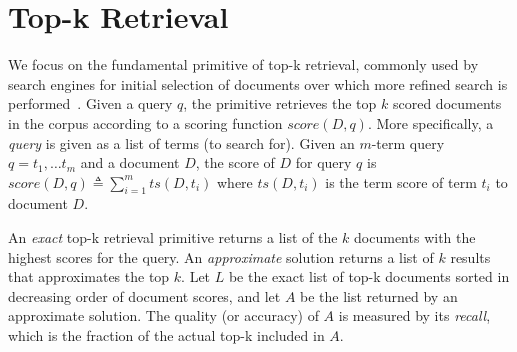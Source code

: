 

\section{Top-k Retrieval}
\label{sec:problem}

We focus on the fundamental primitive of top-k retrieval, commonly used by search engines for initial selection of documents over which more refined search is performed~\cite{Wang:2011}. 
Given a query $q$, the primitive retrieves the top $k$ scored documents in the corpus according to a scoring function $\textit{score}(D, q)$.  
%
More specifically, a \emph{query} is given as a list of terms (to search for). Given an $m$-term query $q = t_1, \dots t_m$ and a document $D$, the score of $D$ for query $q$ is 
$\textit{score}(D, q) \triangleq \sum_{i=1}^m ts(D, t_i)$ 
where $ts(D, t_i)$ is the term score of term $t_i$ to document $D$. 

An \emph{exact} top-k retrieval primitive returns a list of the $k$ documents with the highest scores for the query.
An \emph{approximate} solution returns a list of $k$ results that approximates the top $k$. 
Let $L$ be the exact list of top-k documents sorted in decreasing order of document scores,  
and let $A$ be the list returned by an approximate solution. 
The quality (or accuracy) of  $A$ is measured by its
\emph{recall}, which is  the fraction of the actual top-k included in $A$.



